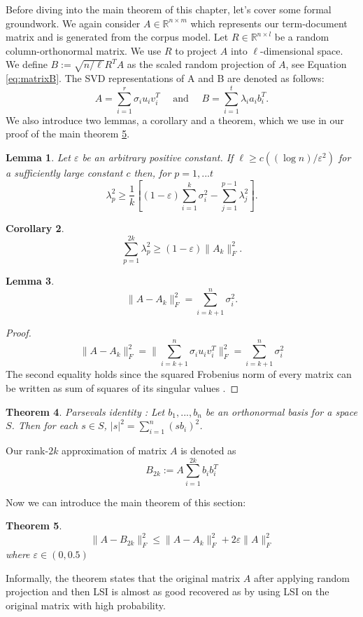 \documentclass[a4paper,11pt,DIV=15]{scrartcl} %
\renewcommand{\epsilon}{\varepsilon}
\theoremstyle{plain}
\newtheorem{theorem}{Theorem}
\newtheorem{lemma}[theorem]{Lemma}
\newtheorem{corollary}[theorem]{Corollary}
\theoremstyle{definition}
\begin{document}
Before diving into the main theorem of this chapter, let's cover some formal groundwork.
We again consider $A \in \mathbb{R}^{n \times m}$ which represents our term-document matrix and is generated from the corpus model. Let $R \in \mathbb{R}^{n \times l} $ be a random column-orthonormal matrix. We use $R$ to project $A$ into $\ell$-dimensional space. We define $B:= \sqrt{n/\ell}R^TA$ as the scaled random projection of $A$, see Equation \eqref{eq:matrixB}.
The SVD representations of A and B are denoted as follows:
\[
A = \sum_{i=1}^r \sigma_i u_i v_i^T \,\,\,\,\,\,\,\,\text{and}\,\,\,\,\,\,\,\, B=\sum_{i=1}^t \lambda_i a_i b_i^T.
\]
We also introduce two lemmas, a corollary and a theorem, which we use in our proof of the main theorem \ref{theorem:imp}.
\begin{lemma}
Let $\epsilon$ be an arbitrary positive constant. If $\ell \geq c((\log n)/\epsilon^2)$ for a sufficiently large constant $c$ then, for  $p =1,...t$
\[
\lambda_p^2 \geq \dfrac{1}{k} \left[(1-\epsilon) \sum_{i=1}^k \sigma_i^2 - \sum_{j=1}^{p-1} \lambda_j^2\right].
\]
\end{lemma}
\begin{corollary}
\label{cor:10}
\[
\sum_{p=1}^{2k} \lambda_p^2 \geq (1-\epsilon) \lVert A_k \rVert_F^2.
\]
\end{corollary}

\begin{lemma}
\label{lem:A_Ak}
\[
\lVert A - A_k \rVert_F^2  = \sum_{i=k+1}^n \sigma_i^2. 
\]
\end{lemma} 
\begin{proof}
\[
\lVert A - A_k \rVert_F^2 = \lVert \sum_{i=k+1}^n \sigma_i u_i v_i^T \rVert_F^2  = \sum_{i=k+1}^n \sigma_i^2 
\]
The second equality holds since the squared Frobenius norm of every matrix can be written as sum of squares of its singular values \cite{FrobeniusDef}.
\end{proof}

\begin{theorem}
    Parsevals identity \cite{hogben2013handbook}:
    Let ${b_1,...,b_n}$ be an orthonormal basis for a space $S$. Then for each $s \in S$, $|s|^2 = \sum_{i=1}^n (sb_i)^2$.
\end{theorem}



Our rank-$2k$ approximation of matrix $A$ is denoted as
\[
B_{2k} := A \sum_{i=1}^{2k} b_ib_i^T
\]

Now we can introduce the main theorem of this section:
\begin{theorem}
\label{theorem:imp}
\[
    \lVert A - B_{2k} \rVert_F^2 \leq \lVert A - A_k \rVert_F^2 + 2\epsilon\lVert A \rVert_F^2
\]
where $\epsilon \in (0,0.5)$
\end{theorem}
Informally, the theorem states that the original matrix $A$ after applying random projection and then LSI is almost as good recovered as by using LSI on the original matrix with high probability.
\end{document}
